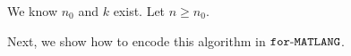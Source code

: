     We know $n_0$ and $k$ exist. Let $n\geq n_0$. 
%
%
%
%


    Next, we show how to encode this algorithm in $\texttt{for}\text{-}\texttt{MATLANG}$.

